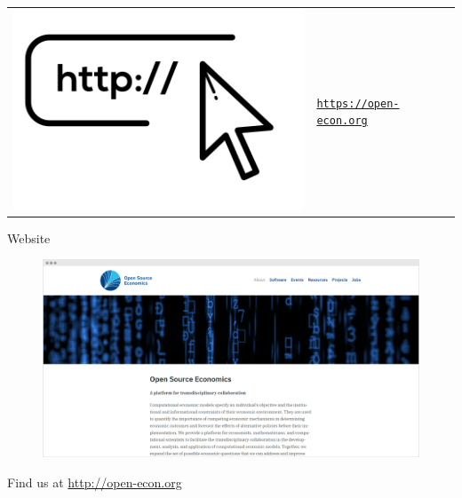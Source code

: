\begin{frame}
\begin{table}[]
\begin{tabularx}{1\textwidth}{>{\centering\arraybackslash}m{1.5cm} >{\arraybackslash}m{5cm}}
		\href{https://open-econ.org}{\includegraphics[scale=0.20]{material/crop-website.png}} & \href{https://open-econ.org}{\texttt{https://open-econ.org}}
	\end{tabularx}
\end{table}

\end{frame}

\begin{frame}{Website}\vspace{-0.2cm}

   \begin{figure}[]
   \includegraphics[scale=0.16]{material/open-econ-website.png}
 \end{figure}\vspace{-0.3cm}

   {\hspace{4.5cm} \large Find us at \url{http://open-econ.org}}

\end{frame}
\backupend

%
%
%
%
%
